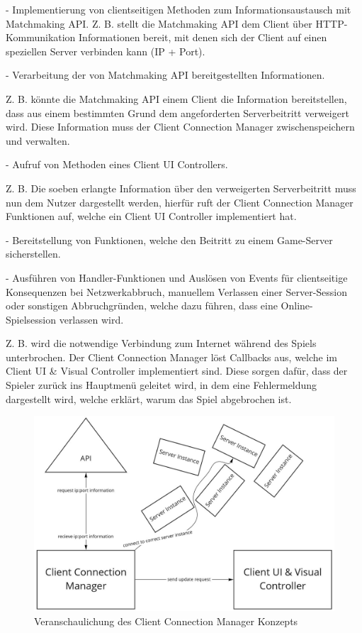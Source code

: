 - Implementierung von clientseitigen Methoden zum Informationsaustausch mit Matchmaking API.
Z. B. stellt die Matchmaking API dem Client über HTTP-Kommunikation Informationen bereit, mit denen sich der Client auf einen speziellen Server verbinden kann (IP + Port). \cite{Wikipedia.2021d} \cite{Wikipedia.2021e}

- Verarbeitung der von Matchmaking API bereitgestellten Informationen. 

Z. B. könnte die Matchmaking API einem Client die Information bereitstellen, dass aus einem bestimmten Grund dem angeforderten Serverbeitritt verweigert wird. Diese Information muss der Client Connection Manager zwischenspeichern und verwalten.

- Aufruf von Methoden eines Client UI Controllers.

Z. B. Die soeben erlangte Information über den verweigerten Serverbeitritt muss nun dem Nutzer dargestellt werden, hierfür ruft der Client Connection Manager Funktionen auf, welche ein Client UI Controller implementiert hat.

- Bereitstellung von Funktionen, welche den Beitritt zu einem Game-Server sicherstellen.

- Ausführen von Handler-Funktionen und Auslösen von Events für clientseitige Konsequenzen bei Netzwerkabbruch, manuellem Verlassen einer Server-Session oder sonstigen Abbruchgründen, welche dazu führen, dass eine Online-Spielsession verlassen wird.

Z. B. wird die notwendige Verbindung zum Internet während des Spiels unterbrochen. Der Client Connection Manager löst Callbacks aus, welche im Client UI \& Visual Controller implementiert sind. Diese sorgen dafür, dass der Spieler zurück ins Hauptmenü geleitet wird, in dem eine Fehlermeldung dargestellt wird, welche erklärt, warum das Spiel abgebrochen ist.

\begin{figure}[H]
	\centering
	\includegraphics[width=150mm]{images/Client_Connection_Manager.jpg}
	\caption[Client Connection Manager Diagramm]{Veranschaulichung des Client Connection Manager Konzepts}
	\label{pic:Client_Connection_Manager}
\end{figure}

